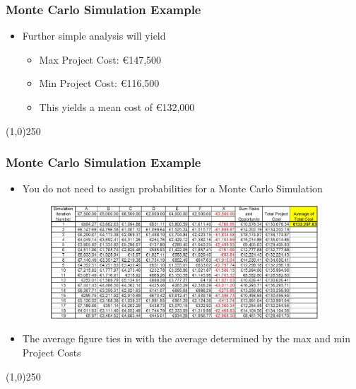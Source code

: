\begin{frame}
\frametitle{Monte Carlo Simulation Example}
\begin{itemize}
\item Further simple analysis will yield
\begin{itemize}
	\item Max Project Cost: \euro147,500
\item Min Project Cost: \euro116,500
\item This yields a mean cost of \euro132,000
\end{itemize}
\end{itemize}
\end{frame}\begin{center}\line(1,0){250}\end{center}


\begin{frame}
\frametitle{Monte Carlo Simulation Example}
\begin{itemize}
\item You do not need to assign probabilities for a Monte Carlo Simulation
\begin{figure}
	\centering
		\includegraphics[width = 10cm]{images/montecarlo.jpg}
	\label{fig:mc1}
\end{figure}
\item The average figure ties in with the average determined by the max and min Project Costs
\end{itemize}
\end{frame}\begin{center}\line(1,0){250}\end{center}


